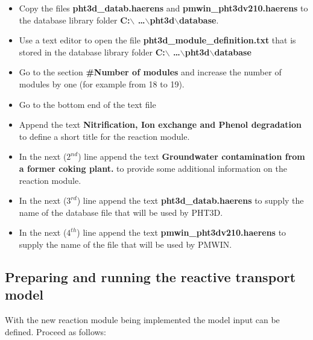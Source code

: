 \begin{itemize}

\item Copy the files {\color{red} \textbf{pht3d\_datab.haerens}} and 
{\color{red} \textbf{pmwin\_pht3dv210.haerens}} to the database library folder {\color{red} \textbf{C:$\backslash$ \ldots $\backslash$pht3d$\backslash$database}}.

\item Use a text editor to open the file {\color{red} \textbf{pht3d\_module\_definition.txt}} that is
stored in the database library folder {\color{red} \textbf{C:$\backslash$ \ldots $\backslash$pht3d$\backslash$database}} 

\item Go to the section {\color{red} \textbf{\#Number of modules}} and increase 
the number of modules by one (for example from 18 to 19).

\item Go to the bottom end of the text file

\item Append the text {\color{red} \textbf{Nitrification, Ion exchange and Phenol degradation}} 
to define a short title for the reaction module.

\item In the next ($2^{nd}$) line append the text {\color{red} \textbf{Groundwater contamination from a former coking plant.}} 
to provide some additional information on the reaction module.

\item In the next ($3^{rd}$) line append the text {\color{red} \textbf{pht3d\_datab.haerens}} to 
supply the name of the database file that will be used by PHT3D.

\item In the next ($4^{th}$) line append the text {\color{red} \textbf{pmwin\_pht3dv210.haerens}}
to supply the name of the file that will be used by PMWIN.

\end{itemize}

\subsection[Preparing and running the reactive transport model]{Preparing and running the reactive transport model}

With the new reaction module being implemented the model input can be defined. 
Proceed as follows:


